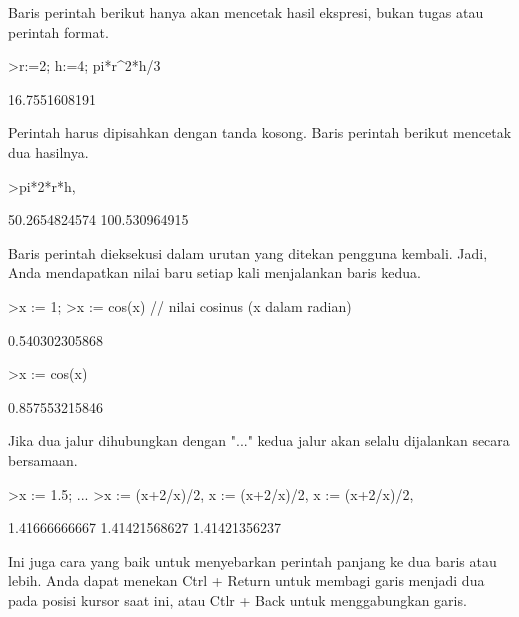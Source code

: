\documentclass{article}
\begin{document}
\begin{eulernotebook}
\begin{eulercomment}
\begin{eulercomment}
\begin{eulercomment}
Baris perintah berikut hanya akan mencetak hasil ekspresi, bukan tugas
atau perintah format.
\end{eulercomment}
\begin{eulerprompt}
>r:=2; h:=4; pi*r^2*h/3
\end{eulerprompt}
\begin{euleroutput}
  16.7551608191
\end{euleroutput}
\begin{eulercomment}
Perintah harus dipisahkan dengan tanda kosong. Baris perintah berikut
mencetak dua hasilnya.
\end{eulercomment}
\begin{eulerprompt}
>pi*2*r*h, %
\end{eulerprompt}
\begin{euleroutput}
  50.2654824574
  100.530964915
\end{euleroutput}
\begin{eulercomment}
Baris perintah dieksekusi dalam urutan yang ditekan pengguna kembali.
Jadi, Anda mendapatkan nilai baru setiap kali menjalankan baris kedua.
\end{eulercomment}
\begin{eulerprompt}
>x := 1;
>x := cos(x) // nilai cosinus (x dalam radian)
\end{eulerprompt}
\begin{euleroutput}
  0.540302305868
\end{euleroutput}
\begin{eulerprompt}
>x := cos(x)
\end{eulerprompt}
\begin{euleroutput}
  0.857553215846
\end{euleroutput}
\begin{eulercomment}
Jika dua jalur dihubungkan dengan "..." kedua jalur akan selalu
dijalankan secara bersamaan.
\end{eulercomment}
\begin{eulerprompt}
>x := 1.5; ...
>x := (x+2/x)/2, x := (x+2/x)/2, x := (x+2/x)/2, 
\end{eulerprompt}
\begin{euleroutput}
  1.41666666667
  1.41421568627
  1.41421356237
\end{euleroutput}
\begin{eulercomment}
Ini juga cara yang baik untuk menyebarkan perintah panjang ke dua
baris atau lebih. Anda dapat menekan Ctrl + Return untuk membagi garis
menjadi dua pada posisi kursor saat ini, atau Ctlr + Back untuk
menggabungkan garis.


\end{eulercomment}
\end{eulercomment}
\end{eulercomment}
\end{eulernotebook}
\end{document}
